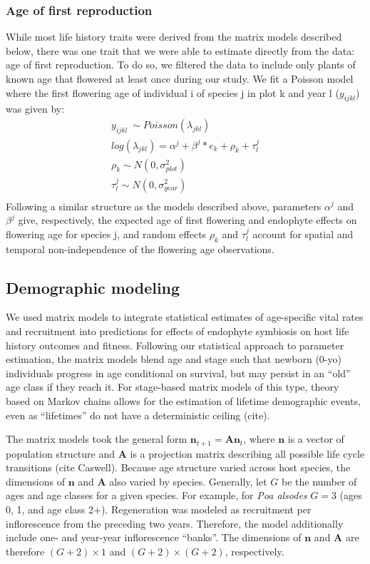 \documentclass[11pt]{article}
\begin{document}
\subsubsection*{Age of first reproduction}
While most life history traits were derived from the matrix models described below, there was one trait that we were able to estimate directly from the data: age of first reproduction. 
To do so, we filtered the data to include only plants of known age that flowered at least once during our study. 
We fit a Poisson model where the first flowering age of individual i of species j in plot k and year l ($y_{ijkl}$) was given by:
\begin{align*}
	y_{ijkl} ~ \sim Poisson(\lambda_{jkl})\\
	log(\lambda_{jkl}) = \alpha^{j} + \beta^{j}*e_k + \rho_k + \tau^{j}_{l}\\
	\rho_k \sim N(0,\sigma^2_{plot})\\
	\tau^{j}_{l} \sim N(0,\sigma^2_{year})\\
\end{align*}
Following a similar structure as the models described above, parameters $\alpha^{j}$ and $\beta^{j}$ give, respectively, the expected age of first flowering and endophyte effects on flowering age for species j, and random effects $\rho_k$ and $\tau^{j}_{l}$ account for spatial and temporal non-independence of the flowering age observations. 

\subsection*{Demographic modeling}
We used matrix models to integrate statistical estimates of age-specific vital rates and recruitment into predictions for effects of endophyte symbiosis on host life history outcomes and fitness. 
Following our statistical approach to parameter estimation, the matrix models blend age and stage such that newborn (0-yo) individuals progress in age conditional on survival, but may persist in an ``old'' age class if they reach it. 
For stage-based matrix models of this type, theory based on Markov chains allows for the estimation of lifetime demographic events, even as ``lifetimes'' do not have a deterministic ceiling (cite). 

The matrix models took the general form $\mathbf{n}_{t+1} = \mathbf{A}\mathbf{n}_{t}$, where $\mathbf{n}$ is a vector of population structure and $\mathbf{A}$ is a projection matrix describing all possible life cycle transitions (cite Caswell). 
Because age structure varied across host species, the dimensions of $\mathbf{n}$ and $\mathbf{A}$ also varied by species. 
Generally, let $G$ be the number of ages and age classes for a given species. 
For example, for \textit{Poa alsodes} $G=3$ (ages 0, 1, and age class 2+). 
Regeneration was modeled as recruitment per inflorescence from the preceding two years. 
Therefore, the model additionally include one- and year-year inflorescence ``banks''. 
The dimensions of $\mathbf{n}$ and $\mathbf{A}$ are therefore $(G+2) \times 1$ and $(G+2) \times (G+2)$, respectively. 
\end{document}
